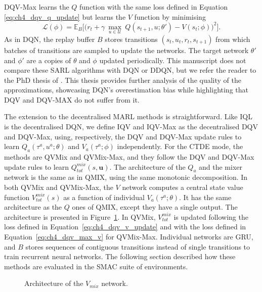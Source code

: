 DQV-Max learns the $Q$ function with the same loss defined in Equation \eqref{eq:ch4_dqv_q_update} but learns the $V$ function by minimising
\begin{equation}
        \mathcal{L}(\phi) = \mathbb{E}_{B} \bigg[\big(r_{t} + \gamma \: \underset{u\in \mathcal{U}}{\max}\: Q(s_{t+1}, u; \theta') - V(s_{t}; \phi)\big)^{2}\bigg].
        \label{eq:ch4_dqv_max_v}
\end{equation}
As in DQN, the replay buffer $B$ stores transitions $(s_{t},u_{t},r_{t},s_{t+1})$ from which batches of transitions are sampled to update the networks.
The target network $\theta'$ and $\phi'$ are a copies of $\theta$ and $\phi$ updated periodically.
This manuscript does not compare these SARL algorithms with DQN or DDQN, but we refer the reader to the PhD thesis of \cite{thesis_matthia}.
This thesis provides further analysis of the quality of the approximations, showcasing DQN's overestimation bias while highlighting that DQV and DQV-MAX do not suffer from it.

The extension to the decentralised MARL methods is straightforward.
Like IQL is the decentralised DQN, we define IQV and IQV-Max as the decentralised DQV and DQV-Max, using, respectively, the DQV and DQV-Max update rules to learn $Q_a(\tau^a, u^a;\theta)$ and $V_a(\tau^a;\phi)$ independently.
For the CTDE mode, the methods are QVMix and QVMix-Max, and they follow the DQV and DQV-Max update rules to learn $Q^{mix}_{tot}(s, \mathbf{u})$.
The architecture of the $Q_a$ and the mixer network is the same as in QMIX, using the same monotonic decomposition.
In both QVMix and QVMix-Max, the $V$ network computes a central state value function $V^{mix}_{tot}(s)$ as a function of individual $V_a(\tau^a;\theta)$.
It has the same architecture as the $Q$ ones of QMIX, except they have a single output. 
The architecture is presented in Figure~\ref{fig:ch4_qvmix}.
In QVMix, $V^{mix}_{tot}$ is updated following the loss defined in Equation~\ref{eq:ch4_dqv_v_update} and with the loss defined in Equation~\ref{eq:ch4_dqv_max_v} for QVMix-Max.
Individual networks are GRU, and $B$ stores sequences of contiguous transitions instead of single transitions to train recurrent neural networks.
The following section described how these methods are evaluated in the SMAC suite of environments. 

\begin{figure}
\centering

\caption{Architecture of the $V_{mix}$ network.}
\label{fig:ch4_qvmix}
\end{figure}



